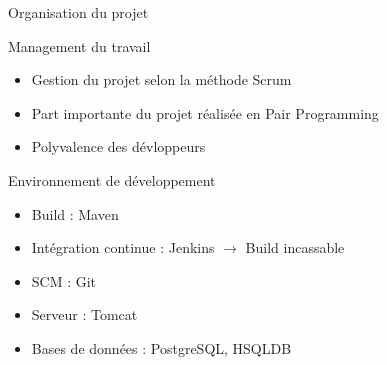 \begin{frame}
	\begin{center}
		\huge{Organisation du projet}
	\end{center}
\end{frame}

\begin{frame}{Management du travail}
	\begin{itemize}
		\item Gestion du projet selon la m\'ethode Scrum
		\item Part importante du projet r\'ealis\'ee en Pair Programming
		\item Polyvalence des d\'evloppeurs
	\end{itemize}
\end{frame}

\begin{frame}{Environnement de d\'eveloppement}
	\begin{itemize}
		\item Build : Maven
		\item Int\'egration continue : Jenkins $\rightarrow$ Build incassable
		\item SCM : Git
		\item Serveur : Tomcat
		\item Bases de donn\'ees : PostgreSQL, HSQLDB
	\end{itemize}
\end{frame}


